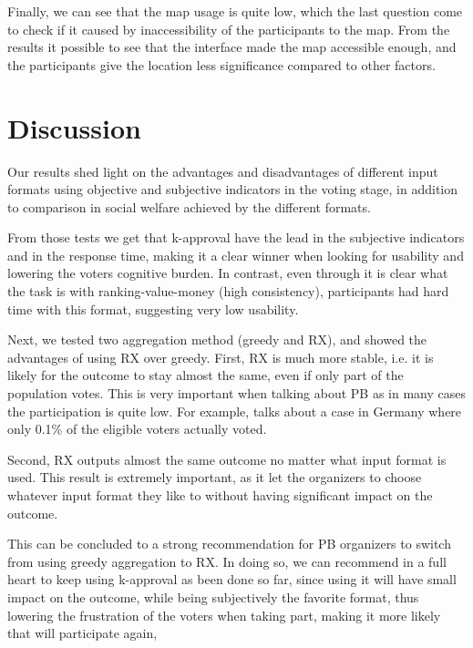 \documentclass[10pt]{article}
\begin{document}
Finally, we can see that the map usage is quite low, which the last question come to check if it caused by inaccessibility of the participants to the map. From the results it possible to see that the interface made the map accessible enough, and the participants give the location less significance compared to other factors.


\section{Discussion}
Our results shed light on the advantages and disadvantages of different input formats using objective and subjective indicators in the voting stage, in addition to comparison in social welfare achieved by the different formats.

From those tests we get that k-approval have the lead in the subjective indicators and in the response time, making it a clear winner when looking for usability and lowering the voters cognitive burden. In contrast, even through it is clear what the task is with ranking-value-money (high consistency), participants had hard time with this format, suggesting very low usability.

Next, we tested two aggregation method (greedy and RX), and showed the advantages of using RX over greedy. First, RX is much more stable, i.e. it is likely for the outcome to stay almost the same, even if only part of the population votes. This is very important when talking about PB as in many cases the participation is quite low. For example, \citet{zepic2017participatory} talks about a case in Germany where only 0.1\% of the eligible voters actually voted. 

Second, RX outputs almost the same outcome no matter what input format is used. This result is extremely important, as it let the organizers to choose whatever input format they like to without having significant impact on the outcome.

This can be concluded to a strong recommendation for PB organizers to switch from using greedy aggregation to RX. In doing so, we can recommend in a full heart to keep using k-approval as been done so far, since using it will have small impact on the outcome, while being subjectively the favorite format, thus lowering the frustration of the voters when taking part, making it more likely that will participate again,

\end{document}
